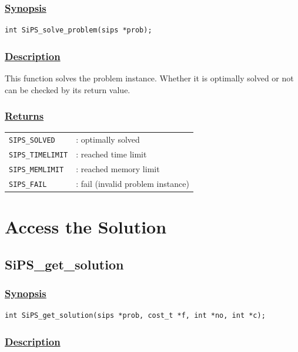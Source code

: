 \documentclass[a4paper]{book}
\begin{document}
\subsubsection{\underline{Synopsis}}

\begin{verbatim}
int SiPS_solve_problem(sips *prob);
\end{verbatim}

\subsubsection{\underline{Description}}

This function solves the problem instance.
Whether it is optimally solved or not can be checked by its return value.

\subsubsection{\underline{Returns}}

\begin{tabular}{ll}
  \verb+SIPS_SOLVED+    &: optimally solved\\
  \verb+SIPS_TIMELIMIT+ &: reached time limit\\
  \verb+SIPS_MEMLIMIT+  &: reached memory limit\\
  \verb+SIPS_FAIL+      &: fail (invalid problem instance)\\
\end{tabular}

\section{Access the Solution}

\hypertarget{SiPS_get_solution}{%
\subsection{SiPS\_get\_solution}
}

\subsubsection{\underline{Synopsis}}

\begin{verbatim}
int SiPS_get_solution(sips *prob, cost_t *f, int *no, int *c);
\end{verbatim}

\subsubsection{\underline{Description}}
\end{document}
